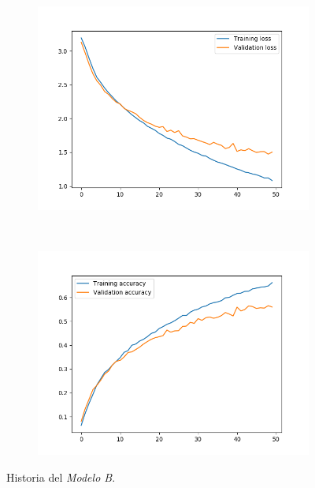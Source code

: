\documentclass[11pt,a4paper]{article}
\begin{document}
\begin{figure}[H]
  \centering
  \begin{subfigure}{.5\textwidth}
    \centering
    \includegraphics[scale=0.4]{img/deep2-drop-loss-50.png}
    \label{fig:deep2-drop-loss-50}
  \end{subfigure}%
  ~ \quad
  \begin{subfigure}{.5\textwidth}
    \centering
    \includegraphics[scale=0.4]{img/deep2-drop-acc-50.png}
    \label{fig:deep2-drop-acc-50}
  \end{subfigure}
  \caption{Historia del \textit{Modelo B}.}
  \label{fig:history-deep2-drop-50}
\end{figure}
\end{document}

